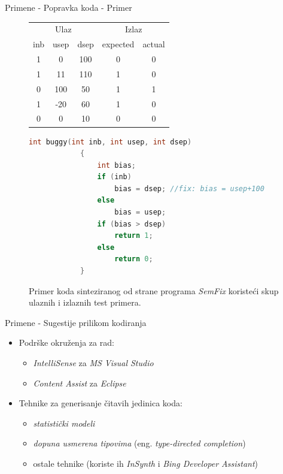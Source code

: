 \documentclass{beamer}
\begin{document}
\begin{frame}[fragile]{Primene - Popravka koda - Primer}
    \begin{figure}[!h]
        \centering
        \tiny
        \begin{tabular}{ccc|cc}
            \multicolumn{3}{c|}{Ulaz} & \multicolumn{2}{c}{Izlaz}\\
            inb & usep & dsep & expected & actual \\
            \hline
            1 & 0 & 100 & 0 & 0 \\
            1 & 11 & 110 & 1 & 0 \\
            0 & 100 & 50 & 1 & 1 \\
            1 & -20 & 60 & 1 & 0 \\
            0 & 0 & 10 & 0 & 0 \\
        \end{tabular}

        \centering
        \begin{lstlisting}[language=C, basicstyle=\tiny]
            int buggy(int inb, int usep, int dsep)
            {
                int bias;
                if (inb)
                    bias = dsep; //fix: bias = usep+100
                else
                    bias = usep;
                if (bias > dsep)
                    return 1;
                else
                    return 0;
            }
        \end{lstlisting}

        \caption{Primer koda sinteziranog od strane programa \emph{SemFix} koristeći skup ulaznih i izlaznih test primera.}
        \label{fig:CodeRepair}
    \end{figure}
\end{frame}

\begin{frame}{Primene - Sugestije prilikom kodiranja}
    \begin{itemize}
        \item Podrške okruženja za rad:
        \begin{itemize}
            \item \emph{IntelliSense} za \emph{MS Visual Studio}
            \item \emph{Content Assist} za \emph{Eclipse}
        \end{itemize}
        \item Tehnike za generisanje čitavih jedinica koda:
        \begin{itemize}
            \item \emph{statistički modeli}
            \item \emph{dopuna usmerena tipovima} (eng. \emph{type-directed completion})
            \item ostale tehnike (koriste ih \emph{InSynth} i \emph{Bing Developer Assistant})
        \end{itemize}
    \end{itemize}
\end{frame}
\end{document}
